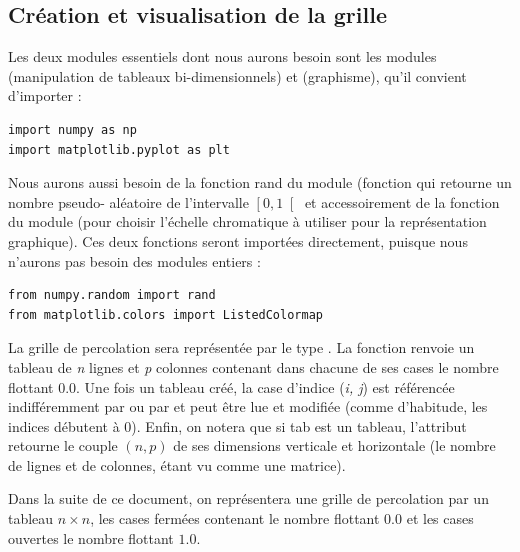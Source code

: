 \subsection{Création et visualisation de la grille}\label{cruxe9ation-et-visualisation-de-la-grille}

Les deux modules essentiels dont nous aurons besoin sont les modules
 (manipulation de tableaux bi-dimensionnels) et 
(graphisme), qu'il convient d'importer :

\begin{lstlisting}
import numpy as np
import matplotlib.pyplot as plt
\end{lstlisting}

Nous aurons aussi besoin de la fonction rand du module 
(fonction qui retourne un nombre pseudo- aléatoire de l'intervalle
$\left[0,1\right[$ et accessoirement de la fonction  du
module  (pour choisir l'échelle chromatique à utiliser
pour la représentation graphique). Ces deux fonctions seront importées
directement, puisque nous n'aurons pas besoin des modules entiers :

\begin{lstlisting}
from numpy.random import rand
from matplotlib.colors import ListedColormap
\end{lstlisting}

La grille de percolation sera représentée par le type . La
fonction  renvoie un tableau de \emph{n} lignes et
\emph{p} colonnes contenant dans chacune de ses cases le nombre flottant
0.0. Une fois un tableau  créé, la case d'indice (\emph{i, j}) est
référencée indifféremment par  ou par  et
peut être lue et modifiée (comme d'habitude, les indices débutent à 0).
Enfin, on notera que si tab est un tableau, l'attribut 
retourne le couple $(n, p)$ de ses dimensions verticale et
horizontale (le nombre de lignes et de colonnes,  étant vu comme une
matrice).

Dans la suite de ce document, on représentera une grille de percolation
par un tableau $n\times n$, les cases fermées contenant le nombre
flottant $0.0$ et les cases ouvertes le nombre flottant $1.0$.

